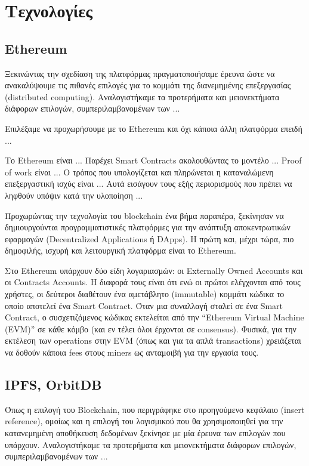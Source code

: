 \section{Τεχνολογίες} \label{section:3-5-technologies}

\subsection{Ethereum}

Ξεκινώντας την σχεδίαση της πλατφόρμας πραγματοποιήσαμε έρευνα ώστε να ανακαλύψουμε τις πιθανές επιλογές για το κομμάτι της διανεμημένης επεξεργασίας (\textenglish{distributed computing}). Αναλογιστήκαμε τα προτερήματα και μειονεκτήματα διάφορων επιλογών, συμπεριλαμβανομένων των ... 

Επιλέξαμε να προχωρήσουμε με το Ethereum και όχι κάποια άλλη πλατφόρμα επειδή ...

Το Ethereum είναι ...
Παρέχει Smart Contracts ακολουθώντας το μοντέλο ...
Proof of work είναι ...
Ο τρόπος που υπολογίζεται και πληρώνεται η καταναλώμενη επεξεργαστική ισχύς είναι ...
Αυτά εισάγουν τους εξής περιορισμούς που πρέπει να ληφθούν υπόψιν κατά την υλοποίηση ...

Προχωρώντας την τεχνολογία του blockchain ένα βήμα παραπέρα, ξεκίνησαν να δημιουργούνται προγραμματιστικές πλατφόρμες για την ανάπτυξη αποκεντρωτικών εφαρμογών (\textenglish{Decentralized Applications} ή DApps). Η πρώτη και, μέχρι τώρα, πιο δημοφιλής, ισχυρή και λειτουργική πλατφόρμα είναι το Ethereum.

Στο Ethereum υπάρχουν δύο είδη λογαριασμών: οι Externally Owned Accounts και οι \textenglish{Contracts Accounts}. Η διαφορά τους είναι ότι ενώ οι πρώτοι ελέγχονται από τους χρήστες, οι δεύτεροι διαθέτουν ένα αμετάβλητο (immutable) κομμάτι κώδικα το οποίο αποτελεί ένα \textenglish{Smart Contract}. Όταν μια συναλλαγή σταλεί σε ένα Smart Contract, ο συσχετιζόμενος κώδικας εκτελείται από την  “Ethereum Virtual Machine (EVM)” σε κάθε κόμβο (και εν τέλει όλοι έρχονται σε consensus). Φυσικά, για την εκτέλεση των operations στην EVM (όπως και για τα απλά \textenglish{transactions}) χρειάζεται να δοθούν κάποια fees στους miners ως ανταμοιβή για την εργασία τους.


\subsection{IPFS, OrbitDB}

Όπως η επιλογή του Blockchain, που περιγράφηκε στο προηγούμενο κεφάλαιο (\textenglish{insert reference}), ομοίως και η επιλογή του λογισμικού που θα χρησιμοποιηθεί για την κατανεμημένη αποθήκευση δεδομένων ξεκίνησε με μία έρευνα των επιλογών που υπάρχουν. Αναλογιστήκαμε τα προτερήματα και μειονεκτήματα διάφορων επιλογών, συμπεριλαμβανομένων των ... 

